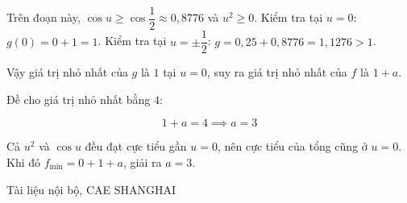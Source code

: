 \documentclass[11pt, a4paper]{article}
\begin{document}
Trên đoạn này, $\cos u \ge \cos\dfrac{1}{2} \approx 0{,}8776$ và $u^2 \ge 0$. Kiểm tra tại $u = 0$: $g(0) = 0 + 1 = 1$. Kiểm tra tại $u = \pm\dfrac{1}{2}$: $g = 0{,}25 + 0{,}8776 = 1{,}1276 > 1$.

Vậy giá trị nhỏ nhất của $g$ là $1$ tại $u = 0$, suy ra giá trị nhỏ nhất của $f$ là $1 + a$.

Đề cho giá trị nhỏ nhất bằng $4$:

$$1 + a = 4 \implies a = 3$$

 Cả $u^2$ và $\cos u$ đều đạt cực tiểu gần $u = 0$, nên cực tiểu của tổng cũng ở $u = 0$. Khi đó $f_{\min} = 0 + 1 + a$, giải ra $a = 3$.
\vspace{0.8cm}
\begin{center}
{\footnotesize\color{cae_blue} Tài liệu nội bộ, CAE SHANGHAI}
\end{center}
\end{document}
